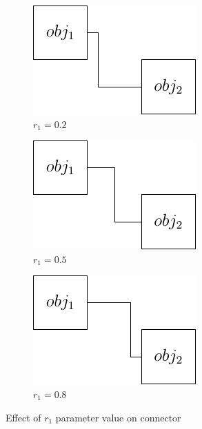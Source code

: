 \documentclass[a4paper,12pt]{report}
\begin{document}
\begin{figure}
  \centering
  \begin{subfigure}{.33\textwidth}
    \centering
    \includegraphics[width=0.9\linewidth]{connectorExample_r1_0_2.pdf}
    \caption{$r_1=0.2$}
  \end{subfigure}\hfill
  \begin{subfigure}{.33\textwidth}
    \centering
    \includegraphics[width=0.9\linewidth]{connectorExample_r1_0_5.pdf}
    \caption{$r_1=0.5$}
  \end{subfigure}\hfill
  \begin{subfigure}{.33\textwidth}
    \centering
    \includegraphics[width=0.9\linewidth]{connectorExample_r1_0_8.pdf}
    \caption{$r_1=0.8$}
  \end{subfigure}

  \caption{Effect of $r_1$ parameter value on connector}
  \label{fig:r1_connectorExample}
\end{figure}
\end{document}
